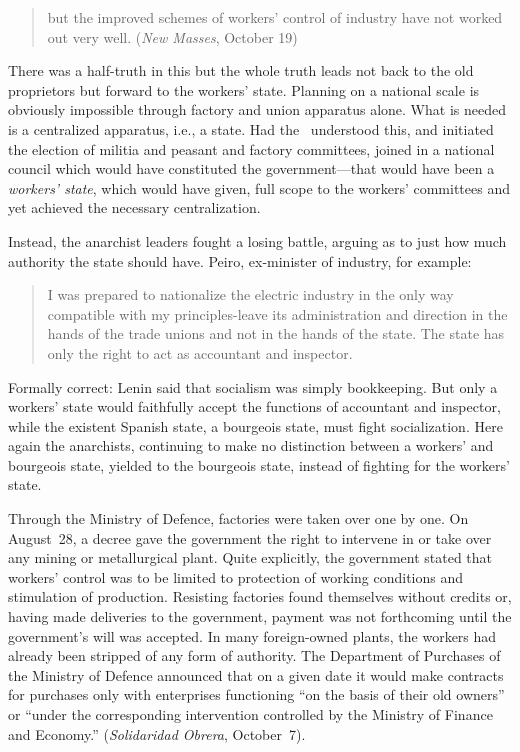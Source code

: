 \begin{quotation}
  \noindent
  but the improved schemes of workers’ control of industry have not worked out very well. (\emph{New Masses}, October 19)  
\end{quotation}

There was a half-truth in this but the whole truth leads not back to the old proprietors but forward to the workers’ state. Planning on a national scale is obviously impossible through factory and union apparatus alone. What is needed is a centralized apparatus, i.e., a state. Had the \CNT\ understood this, and initiated the election of militia and peasant and factory committees, joined in a national council which would have constituted the government---that would have been a \emph{workers’ state}, which would have given, full scope to the workers’ committees and yet achieved the necessary centralization.

Instead, the anarchist leaders fought a losing battle, arguing as to just how much authority the state should have. Peiro, ex-minister of industry, for example:

\begin{quotation}
  I was prepared to nationalize the electric industry in the only way compatible with my principles-leave its administration and direction in the hands of the trade unions and not in the hands of the state. The state has only the right to act as accountant and inspector.
\end{quotation}

Formally correct: Lenin said that socialism was simply bookkeeping. But only a workers’ state would faithfully accept the functions of accountant and inspector, while the existent Spanish state, a bourgeois state, must fight socialization. Here again the anarchists, continuing to make no distinction between a workers’ and bourgeois state, yielded to the bourgeois state, instead of fighting for the workers’ state.

Through the Ministry of Defence, factories were taken over one by one. On August~28, a decree gave the government the right to intervene in or take over any mining or metallurgical plant. Quite explicitly, the government stated that workers’ control was to be limited to protection of working conditions and stimulation of production. Resisting factories found themselves without credits or, having made deliveries to the government, payment was not forthcoming until the government’s will was accepted. In many foreign-owned plants, the workers had already been stripped of any form of authority. The Department of Purchases of the Ministry of Defence announced that on a given date it would make contracts for purchases only with enterprises functioning ``on the basis of their old owners'' or ``under the corresponding intervention controlled by the Ministry of Finance and Economy.'' (\emph{Solidaridad Obrera}, October~7).

